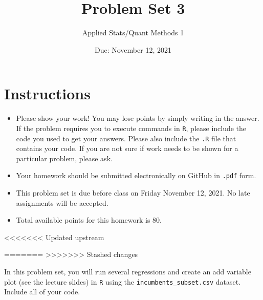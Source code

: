 \documentclass[12pt,letterpaper]{article}
\title{Problem Set 3}
\date{Due: November 12, 2021}
\author{Applied Stats/Quant Methods 1}
\begin{document}
	\maketitle
	\section*{Instructions}
	\begin{itemize}
		\item Please show your work! You may lose points by simply writing in the answer. If the problem requires you to execute commands in \texttt{R}, please include the code you used to get your answers. Please also include the \texttt{.R} file that contains your code. If you are not sure if work needs to be shown for a particular problem, please ask.
		\item Your homework should be submitted electronically on GitHub in \texttt{.pdf} form.
		\item This problem set is due before class on Friday November 12, 2021. No late assignments will be accepted.
		\item Total available points for this homework is 80.
	\end{itemize}
		
<<<<<<< Updated upstream
		
=======
>>>>>>> Stashed changes
	
	\vspace{.25cm}
	
	\noindent In this problem set, you will run several regressions and create an add variable plot (see the lecture slides) in \texttt{R} using the \texttt{incumbents\_subset.csv} dataset. Include all of your code.
	
	\vspace{.5cm}
\end{document}

